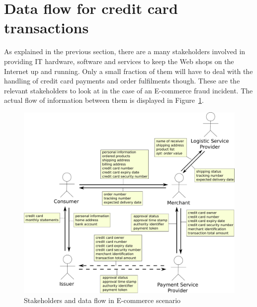 
\section{Data flow for credit card transactions}
\label{sec:stakeholder_data_flow}

As explained in the previous section, there are a many stakeholders involved in providing \gls{IT} hardware, software and services to keep the Web shops on the Internet up and running. Only a small fraction of them will have to deal with the handling of credit card payments and order fulfilments though. These are the relevant stakeholders to look at in the case of an \gls{E-commerce} fraud incident. The actual flow of information between them is displayed in  Figure~\ref{fig:images_e_commerce_stakeholder}. \@

\begin{figure}[H]
	\centering
		\includegraphics[width=0.9\columnwidth]{images/e-commerce-stakeholder.pdf}
	\caption{Stakeholders and data flow in \gls{E-commerce} scenario}
\label{fig:images_e_commerce_stakeholder}
\end{figure}
